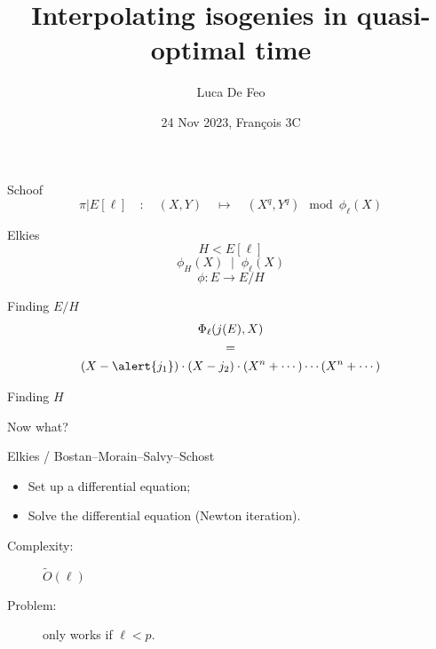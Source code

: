 \documentclass[12pt,aspectratio=169]{beamer}
\title{Interpolating isogenies in quasi-optimal time}
\author{Luca De Feo}
\date[24 Nov 2023, François 3C]{24 Nov 2023, François 3C}
\institute{IBM Research Zürich}
\begin{document}
\frame[plain]{\titlepage}


\begin{frame}{Schoof}
  \large
  \[\pi|E[\ell] \quad:\quad (X,Y) \quad\mapsto\quad (X^q, Y^q) \mod \phi_\ell(X)\]
\end{frame}


\begin{frame}{Elkies}
  \large
  \[H < E[\ell]\]
  \pause
  \[\phi_H(X) \;\mid\; \phi_\ell(X)\]
  \pause
  \[\phi : E \to E/H\]
\end{frame}


\begin{frame}{Finding $E/H$}
  \large
  \begin{gather*}
    \Phi_\ell(j(E), X)\\
    =\\
    (X-\alert{j_1}) \cdot (X-j_2) \cdot (X^n + \cdots) \cdots (X^n + \cdots)
  \end{gather*}
\end{frame}


\begin{frame}{Finding $H$}
  \large\centering
  
  
  \bigskip

  Now what?
\end{frame}


\begin{frame}{Elkies / Bostan--Morain--Salvy--Schost}
  \large
  \begin{itemize}
  \item Set up a differential equation;
  \item Solve the differential equation (Newton iteration).
  \end{itemize}

  \bigskip
  \begin{description}
  \item[Complexity:] $\tilde{O}(\ell)$
  \item[Problem:] only works if $\ell < p$.
  \end{description}
\end{frame}
\end{document}
